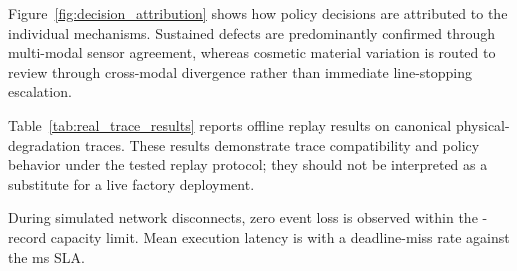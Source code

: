 \documentclass[conference]{IEEEtran}
\begin{document}
Figure~\ref{fig:decision_attribution} shows how policy decisions are attributed to the individual mechanisms. Sustained defects are predominantly confirmed through multi-modal sensor agreement, whereas cosmetic material variation is routed to review through cross-modal divergence rather than immediate line-stopping escalation.

\begin{table}[!b]
    \centering
    \caption{Validation on run-to-failure traces from NASA IMS bearing and C-MAPSS turbofan datasets.}
    \label{tab:real_trace_results}
\end{table}

Table~\ref{tab:real_trace_results} reports offline replay results on canonical physical-degradation traces. These results demonstrate trace compatibility and policy behavior under the tested replay protocol; they should not be interpreted as a substitute for a live factory deployment.

During simulated network disconnects, zero event loss is observed within the \SpoolBufferCapacity{}-record capacity limit. Mean execution latency is \MeanPipelineLatency{} with a \DeadlineMissRate{} deadline-miss rate against the \TargetDeadlineMs{} ms SLA.

\balance
\end{document}
